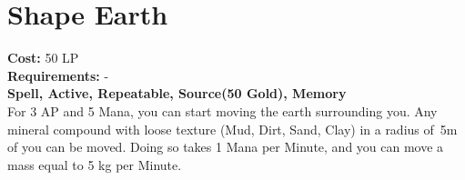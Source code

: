 \section{Shape Earth}\label{spell:shapeEarth}
\textbf{Cost:} 50 LP\\
\textbf{Requirements:} -\\
\textbf{Spell, Active, Repeatable, Source(50 Gold), Memory}\\
For 3 AP and 5 Mana, you can start moving the earth surrounding you.
Any mineral compound with loose texture (Mud, Dirt, Sand, Clay) in a radius of~5m of you can be moved.
Doing so takes 1 Mana per Minute, and you can move a mass equal to 5 kg per Minute.